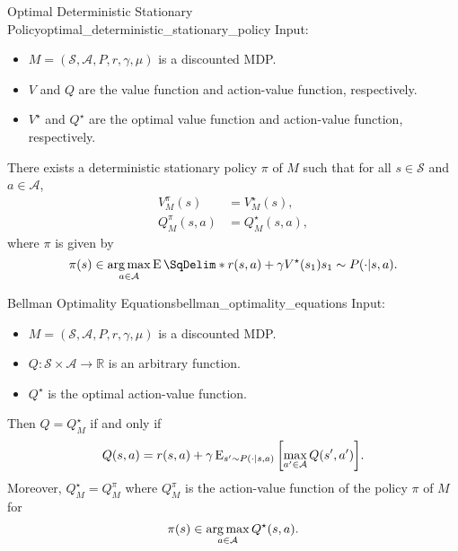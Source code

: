 \documentclass{article}
\begin{document}
\begin{theorem}{Optimal Deterministic Stationary Policy}{optimal_deterministic_stationary_policy}
    Input:
    \begin{itemize}
        \item $M=(\mathcal{S}, \mathcal{A}, P, r, \gamma, \mu)$ is a discounted MDP.
        \item $V$ and $Q$ are the value function and action-value function, respectively.
        \item $V^\star$ and $Q^\star$ are the optimal value function and action-value function, respectively.
    \end{itemize}
    There exists a deterministic stationary policy $\pi$ of $M$ such that for all $s\in\mathcal{S}$ and $a\in\mathcal{A}$,
    \begin{align*}
        V^\pi_M(s) &= V^\star_M(s), \\
        Q^\pi_M(s,a) &= Q^\star_M(s,a),
    \end{align*}
    where $\pi$ is given by
    \[ \pi(s) \in \argmax_{a\in\mathcal{A}} \operatorname{E}\SqDelim*{r(s,a) + \gamma V^\star(s_1)}{s_1\sim P(\cdot|s,a)}. \]
\end{theorem}

\begin{theorem}{Bellman Optimality Equations}{bellman_optimality_equations}
    Input:
    \begin{itemize}
        \item $M=(\mathcal{S}, \mathcal{A}, P, r, \gamma, \mu)$ is a discounted MDP.
        \item $Q: \mathcal{S}\times \mathcal{A} \rightarrow \mathbb{R}$ is an arbitrary function.
        \item $Q^\star$ is the optimal action-value function.
    \end{itemize}
    Then $Q=Q^\star_M$ if and only if
    \[ Q(s,a) = r(s,a) + \gamma \operatorname{E}_{s'\sim P(\cdot|s,a)}\qty[\max_{a'\in \mathcal{A}} Q(s',a')]. \]
    Moreover, $Q^\star_M = Q^\pi_M$ where $Q^\pi_M$ is the action-value function of the policy $\pi$ of $M$ for
    \[ \pi(s) \in \operatorname*{arg\,max}_{a\in\mathcal{A}} Q^{\star}(s,a). \]
\end{theorem}

% 
% 
\end{document}
